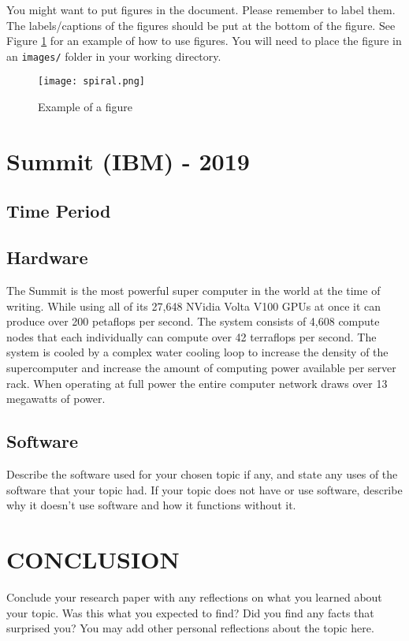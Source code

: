 \documentclass[letterpaper, 10 pt, conference]{IEEEconf}
\begin{document}
You might want to put figures in the document. Please
remember to label them. The labels/captions of the figures
should be put at the bottom of the figure. See Figure
\ref{fig:example} for an example of how to use figures.
You will need to place the figure in an \texttt{images/} folder
in your working directory.

\begin{figure}[h!]
\centering
\texttt{[image: spiral.png]}
\caption{Example of a figure}
\label{fig:example}
\end{figure} 

\section{Summit (IBM) - 2019}
\subsection{Time Period}
\subsection{Hardware}
The Summit is the most powerful super computer in the world at the time of writing. While using all of its 27,648 NVidia Volta V100 GPUs at once it can produce over 200 petaflops per second. The system consists of 4,608 compute nodes that each individually can compute over 42 terraflops per second. The system is cooled by a complex water cooling loop to increase the density of the supercomputer and increase the amount of computing power available per server rack. When operating at full power the entire computer network draws over 13 megawatts of power.
\subsection{Software}

Describe the software used for your chosen topic if any,
and state any uses of the software that your topic had.
If your topic does not have or use software, describe why it
doesn't use software and how it functions without it.

\section{CONCLUSION}

Conclude your research paper with any reflections on what you
learned about your topic. Was this what you expected to find?
Did you find any facts that surprised you? You may add other
personal reflections about the topic here.
\end{document}
